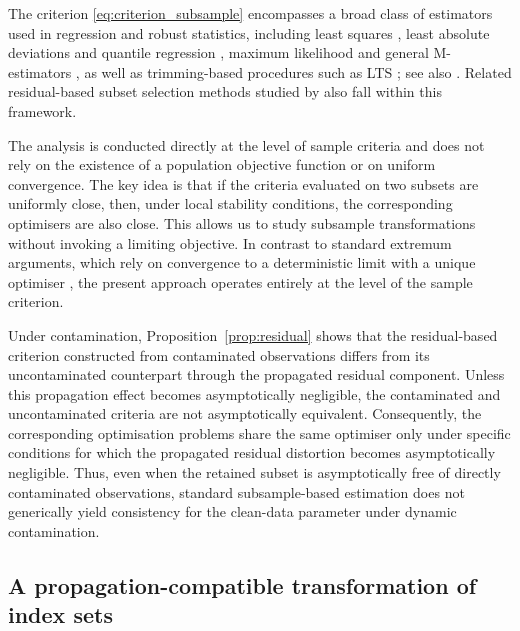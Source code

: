 \documentclass[12pt]{article}
\numberwithin{equation}{section}
\begin{document}
The criterion \eqref{eq:criterion_subsample} encompasses a broad class of estimators used in regression and robust statistics, including least squares \citep{Amemiya1985}, least absolute deviations and quantile regression \citep{KoenkerBassett1978}, maximum likelihood and general M-estimators \citep{Huber1964, NeweyMcFadden1994}, as well as trimming-based procedures such as LTS \citep{Ro84}; see also \citet{Maronna2006}. 
Related residual-based subset selection methods studied by \citet{JohansenNielsen2009,JohansenNielsen2013,JohansenNielsen2016} also fall within this framework.

The analysis is conducted directly at the level of sample criteria and does not rely on the existence of a population objective function or on uniform convergence. 
The key idea is that if the criteria evaluated on two subsets are uniformly close, then, under local stability conditions, the corresponding optimisers are also close. 
This allows us to study subsample transformations without invoking a limiting objective. 
In contrast to standard extremum arguments, which rely on convergence to a deterministic limit with a unique optimiser \citep{Cizek2008}, the present approach operates entirely at the level of the sample criterion.

Under contamination, Proposition~\ref{prop:residual} shows that the residual-based criterion constructed from contaminated observations differs from its uncontaminated counterpart through the propagated residual component.
Unless this propagation effect becomes asymptotically negligible, the contaminated and uncontaminated criteria are not asymptotically equivalent.
Consequently, the corresponding optimisation problems share the same optimiser only under specific conditions for which the propagated residual distortion becomes asymptotically negligible.
Thus, even when the retained subset is asymptotically free of directly contaminated observations, standard subsample-based estimation does not generically yield consistency for the clean-data parameter under dynamic contamination.


\subsection{A propagation-compatible transformation of index sets}
\end{document}
